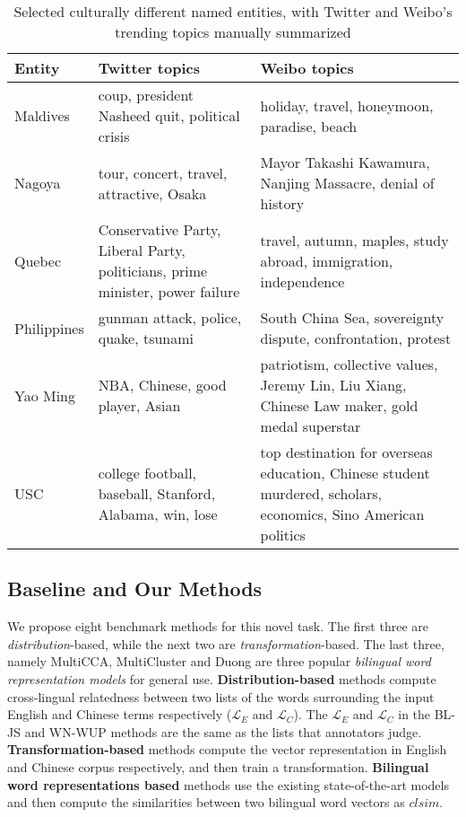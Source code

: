  
\begin{table*}[t]
	\scriptsize
	\centering
	\caption{{Selected culturally different named entities, with Twitter and Weibo's trending topics manually summarized}\vspace{-15pt}}
	\begin{tabular}{L{1.5cm} L{5cm} L{8cm}}
		\textbf{Entity} & \textbf{Twitter topics} & \textbf{Weibo topics}
		\\ \hline
		Maldives & coup, president Nasheed quit, political crisis & holiday, travel, honeymoon, paradise, beach \\ \hline
		Nagoya & tour, concert, travel, attractive, Osaka & Mayor Takashi Kawamura, Nanjing Massacre, denial of history\\  \hline
				Quebec & Conservative Party, Liberal Party, politicians, prime minister, power failure & travel, autumn, maples, study abroad, immigration, independence   \\ \hline
				Philippines & gunman attack, police, quake, tsunami & South China Sea, sovereignty dispute, confrontation, protest  \\ \hline
		Yao Ming & NBA, Chinese, good player, Asian  & patriotism, collective values, Jeremy Lin, Liu Xiang, Chinese Law maker, gold medal superstar   \\ \hline USC & college football, baseball, Stanford, Alabama, win, lose & top destination for overseas education, 
Chinese student murdered, scholars, economics, Sino American politics \\ \hline
	\end{tabular}
\vspace{-10pt}
	\label{tab:mcdne_res_4}
\end{table*}
\subsection{Baseline and Our Methods} 
We propose eight benchmark methods for this novel task. 
The first three are \emph{distribution}-based, while the next two 
are \emph{transformation}-based. 
The last three, namely MultiCCA,
MultiCluster and Duong are three popular \emph{bilingual word representation models} for general use.   
\textbf{Distribution-based} methods compute cross-lingual relatedness between two lists of the words surrounding the input English and Chinese terms respectively ($\mathcal{L}_E$ and $\mathcal{L}_C$). 
The $\mathcal{L}_E$  and $\mathcal{L}_C$  in the BL-JS and WN-WUP methods are the same as the lists that annotators judge.
\textbf{Transformation-based} methods compute the vector representation 
in English and Chinese corpus respectively, and
then train a transformation.
\textbf{Bilingual word representations based} methods use the existing state-of-the-art models and then compute the similarities between two bilingual word vectors as $clsim$.

